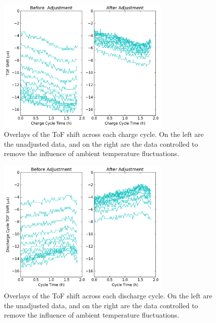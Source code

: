 \begin{figure}[t]\label{fig:0417chargeadj}
\includegraphics[width=0.75\textwidth]{Thesis/0417chargeAdjust.png}
\centering
\caption{Overlays of the ToF shift across each charge cycle. On the left are the unadjusted data, and on the right are the data controlled to remove the influence of ambient temperature fluctuations.}
\end{figure}

\begin{figure}[t]\label{fig:0417dischargeadj}
\includegraphics[width=0.75\textwidth]{Thesis/0417dischargeAdjust.png}
\centering
\caption{Overlays of the ToF shift across each discharge cycle. On the left are the unadjusted data, and on the right are the data controlled to remove the influence of ambient temperature fluctuations.}
\end{figure}

